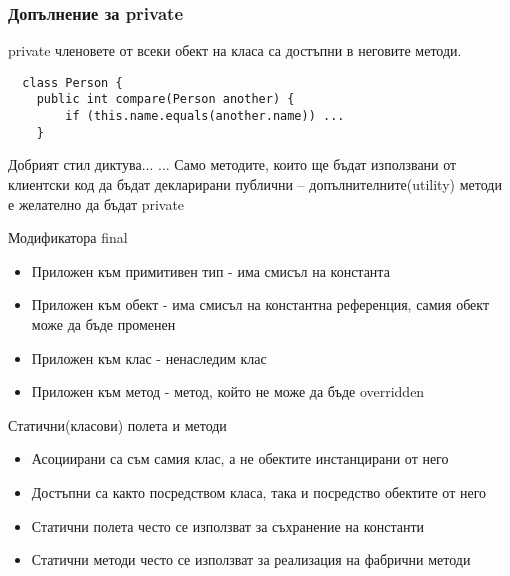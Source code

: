 \documentclass{beamer}
\begin{document}
\begin{frame}[fragile]
  \frametitle{Допълнение за private}
  \transdissolve
    private членовете от всеки обект на
    класа са достъпни в неговите методи.
\begin{lstlisting}
  class Person {
    public int compare(Person another) {
        if (this.name.equals(another.name)) ...
    }
\end{lstlisting}
\end{frame}


\begin{frame}{Добрият стил диктува...}
  \transdissolve
  ... Само методите, които ще бъдат
  използвани от клиентски код да бъдат
  декларирани публични –
  допълнителните(utility) методи е
  желателно да бъдат private

\end{frame}

\begin{frame}{Модификатора final}
  \transdissolve
  \begin{itemize}
  \item Приложен към примитивен тип -  има
    смисъл на константа
  \item  Приложен към обект -  има смисъл на
    константна референция, самия обект
    може да бъде променен
  \item  Приложен към клас -  ненаследим клас
  \item  Приложен към метод -  метод, който не
    може да бъде overridden
  \end{itemize}
\end{frame}

\begin{frame}{Статични(класови) полета и методи}
  \transdissolve
  \begin{itemize}
  \item   Асоциирани са съм самия клас, а не
    обектите инстанцирани от него
  \item  Достъпни са както посредством класа,
    така и посредство обектите от него
  \item  Статични полета често се използват за
    съхранение на константи
  \item  Статични методи често се използват за
    реализация на фабрични методи

  \end{itemize}
\end{frame}
\end{document}
